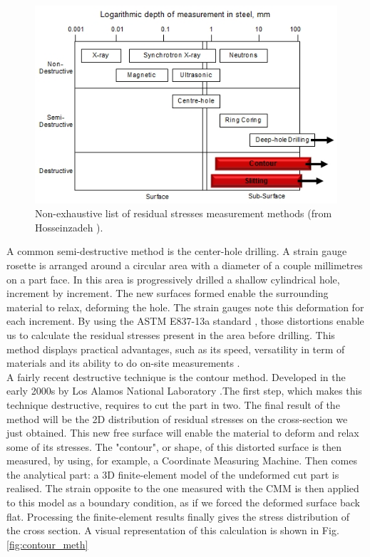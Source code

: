 \begin{figure}[ht]
	\centering
	\includegraphics[scale=0.80]{Images/rs_measure}
	\decoRule
	\caption[Non-exhaustive list of residual stresses measurement methods.]{Non-exhaustive list of residual stresses measurement methods (from Hosseinzadeh \parencite{Openuni}).}
	\label{fig:rs_measure}
\end{figure}

A common semi-destructive method is the center-hole drilling. A strain gauge rosette is arranged around a circular area with a diameter of a couple millimetres on a part face. In this area is progressively drilled a shallow cylindrical hole, increment by increment. The new surfaces formed enable the surrounding material to relax, deforming the hole. The strain gauges note this deformation for each increment. By using the ASTM E837-13a standard \cite{ASTM}, those distortions enable us to calculate the residual stresses present in the area before drilling. This method displays practical advantages, such as its speed, versatility in term of materials and its ability to do on-site measurements \cite{G2MT}. \\

A fairly recent destructive technique is the contour method. Developed in the early 2000s by Los Alamos National Laboratory \cite{LANL}.The first step, which makes this technique destructive, requires to cut the part in two. The final result of the method will be the 2D distribution of residual stresses on the cross-section we just obtained. This new free surface will enable the material to deform and relax some of its stresses. The "contour", or shape, of this distorted surface is then measured, by using, for example, a Coordinate Measuring Machine. Then comes the analytical part: a 3D finite-element model of the undeformed cut part is realised. The strain opposite to the one measured with the CMM is then applied to this model as a boundary condition, as if we forced the deformed surface back flat. Processing the finite-element results finally gives the stress distribution of the cross section. A visual representation of this calculation is shown in Fig.\ref{fig:contour_meth}\\

